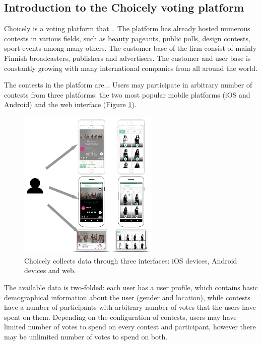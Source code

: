 \subsection{Introduction to the Choicely voting platform}
    Choicely is a voting platform that... The platform has already hosted numerous contests in various fields, such as beauty pageants, public polls, design contests, sport events among many others. The customer base of the firm consist of mainly Finnish broadcasters, publishers and advertisers. The customer and user base is constantly growing with many international companies from all around the world.
    
    The contests in the platform are... Users may participate in arbitrary number of contests from three platforms: the two most popular mobile platforms (iOS and Android) and the web interface (Figure \ref{choicely_platforms}). 

    \begin{figure}[h] 
		\begin{center}
			\includegraphics[width=0.6\textwidth]{images/choicely_platforms.png}
			\caption{Choicely collects data through three interfaces: iOS devices, Android devices and web.}
			\label{choicely_platforms}
		\end{center}
	\end{figure}

    The available data is two-folded: each user has a user profile, which contains basic demographical information about the user (gender and location), while contests have a number of participants with arbitrary number of votes that the users have spent on them. Depending on the configuration of contests, users may have limited number of votes to spend on every contest and participant, however there may be unlimited number of votes to spend on both. 

